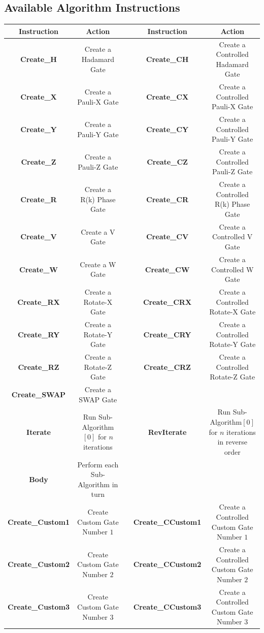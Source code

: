 \clearpage
\begin{landscape}

\chapter{Available Algorithm Instructions}
\label{sec:alginstructionlist}
\centering
\begin{tabular}{|c|c|c|c|c|}
\hline
\textbf{Instruction} & \textbf{Action} & & \textbf{Instruction} & \textbf{Action}  \\
\hline
\textbf{Create\_H} & Create a Hadamard Gate & & \textbf{Create\_CH} & Create a Controlled Hadamard Gate \\
\hline
\textbf{Create\_X} & Create a Pauli-X Gate & & \textbf{Create\_CX} & Create a Controlled Pauli-X Gate \\
\hline
\textbf{Create\_Y} & Create a Pauli-Y Gate & & \textbf{Create\_CY} & Create a Controlled Pauli-Y Gate \\
\hline
\textbf{Create\_Z} & Create a Pauli-Z Gate & & \textbf{Create\_CZ} & Create a Controlled Pauli-Z Gate \\
\hline
\textbf{Create\_R} & Create a R(k) Phase Gate & & \textbf{Create\_CR} & Create a Controlled R(k) Phase Gate \\
\hline
\textbf{Create\_V} & Create a V Gate & & \textbf{Create\_CV} & Create a Controlled V Gate \\
\hline
\textbf{Create\_W} & Create a W Gate & & \textbf{Create\_CW} & Create a Controlled W Gate \\
\hline
\textbf{Create\_RX} & Create a Rotate-X Gate & & \textbf{Create\_CRX} & Create a Controlled Rotate-X Gate \\
\hline
\textbf{Create\_RY} & Create a Rotate-Y Gate & & \textbf{Create\_CRY} & Create a Controlled Rotate-Y Gate \\
\hline
\textbf{Create\_RZ} & Create a Rotate-Z Gate & & \textbf{Create\_CRZ} & Create a Controlled Rotate-Z Gate \\
\hline
\textbf{Create\_SWAP} & Create a SWAP Gate & &  &  \\
\hline
\textbf{Iterate} & Run Sub-Algorithm$[0]$ for $n$ iterations & & \textbf{RevIterate} & Run Sub-Algorithm$[0]$ for $n$ iterations in reverse order\\
\hline
\textbf{Body} & Perform each Sub-Algorithm in turn & & & \\
\hline
\textbf{Create\_Custom1} & Create Custom Gate Number $1$ & & \textbf{Create\_CCustom1} & Create a Controlled Custom Gate Number $1$ \\
\hline
\textbf{Create\_Custom2} & Create Custom Gate Number $2$ & & \textbf{Create\_CCustom2} & Create a Controlled Custom Gate Number $2$ \\
\hline
\textbf{Create\_Custom3} & Create Custom Gate Number $3$ & & \textbf{Create\_CCustom3} & Create a Controlled Custom Gate Number $3$ \\
\hline
\end{tabular}
\clearpage
\end{landscape}
